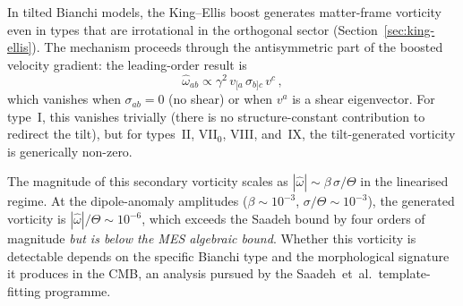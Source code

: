 In tilted Bianchi models, the King--Ellis boost generates
matter-frame vorticity even in types that are irrotational in
the orthogonal sector (Section~\ref{sec:king-ellis}).  The
mechanism proceeds through the antisymmetric part of the
boosted velocity gradient: the leading-order result is
\begin{equation}\label{eq:tilt-vort}
\hat{\omega}_{ab} \propto \gamma^2\,
  v_{[a}\,\sigma_{b]c}\,v^c\,,
\end{equation}
which vanishes when $\sigma_{ab} = 0$ (no shear) or when $v^a$
is a shear eigenvector.  For type~I, this vanishes trivially
(there is no structure-constant contribution to redirect the
tilt), but for types~II, VII$_0$, VIII, and~IX, the
tilt-generated vorticity is generically non-zero.

The magnitude of this secondary vorticity scales as
$|\hat{\omega}| \sim \beta\,\sigma/\Theta$ in the linearised
regime.  At the dipole-anomaly amplitudes
($\beta \sim 10^{-3}$, $\sigma/\Theta \sim 10^{-3}$),
the generated vorticity is $|\hat{\omega}|/\Theta \sim 10^{-6}$,
which exceeds the Saadeh bound by four orders of magnitude
\emph{but is below the MES algebraic bound}.  Whether this
vorticity is detectable depends on the specific Bianchi type and
the morphological signature it produces in the CMB, an analysis
pursued by the Saadeh~et~al.\ template-fitting programme.



